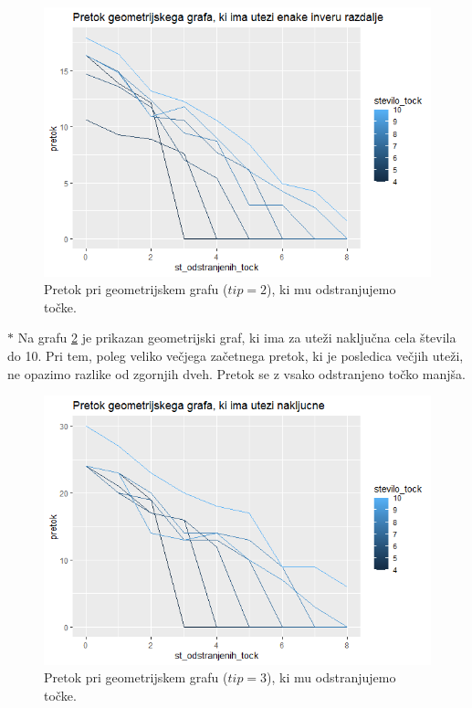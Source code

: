 \documentclass[a4paper]{article}
\begin{document}
\begin{figure}[H]
\centerline{\includegraphics[scale=.5]{p6_2.PNG}}
\caption{Pretok pri geometrijskem grafu ($tip = 2$), ki mu odstranjujemo točke.}
\label{fig7}
\end{figure}

$\ast$  Na grafu \ref{fig8} je prikazan geometrijski graf, ki ima za uteži naključna cela števila do 10. Pri tem, poleg veliko večjega začetnega pretok, ki je posledica večjih uteži, ne opazimo razlike od zgornjih dveh. Pretok se z vsako odstranjeno točko manjša.

\begin{figure}[H]
\centerline{\includegraphics[scale=.5]{p6_3.PNG}}
\caption{Pretok pri geometrijskem grafu ($tip = 3$), ki mu odstranjujemo točke.}
\label{fig8}
\end{figure}
\end{document}
